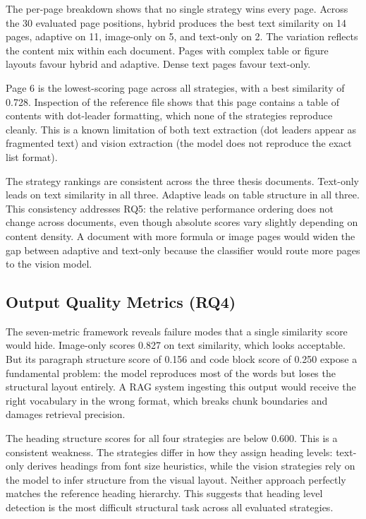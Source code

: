 \documentclass[12pt]{article}
\begin{document}
The per-page breakdown shows that no single strategy wins every page.
Across the 30 evaluated page positions, hybrid produces the best text
similarity on 14 pages, adaptive on 11, image-only on 5, and text-only
on 2. The variation reflects the content mix within each document.
Pages with complex table or figure layouts favour hybrid and adaptive.
Dense text pages favour text-only.

Page 6 is the lowest-scoring page across all strategies, with a best
similarity of 0.728. Inspection of the reference file shows that this
page contains a table of contents with dot-leader formatting, which none
of the strategies reproduce cleanly. This is a known limitation of both
text extraction (dot leaders appear as fragmented text) and vision
extraction (the model does not reproduce the exact list format).

The strategy rankings are consistent across the three thesis documents.
Text-only leads on text similarity in all three. Adaptive leads on table
structure in all three. This consistency addresses RQ5: the relative
performance ordering does not change across documents, even though absolute
scores vary slightly depending on content density. A document with more
formula or image pages would widen the gap between adaptive and text-only
because the classifier would route more pages to the vision model.

\subsection{Output Quality Metrics (RQ4)}

The seven-metric framework reveals failure modes that a single similarity
score would hide. Image-only scores 0.827 on text similarity, which looks
acceptable. But its paragraph structure score of 0.156 and code block score
of 0.250 expose a fundamental problem: the model reproduces most of the
words but loses the structural layout entirely. A RAG system ingesting this
output would receive the right vocabulary in the wrong format, which breaks
chunk boundaries and damages retrieval precision.

The heading structure scores for all four strategies are below 0.600. This
is a consistent weakness. The strategies differ in how they assign heading
levels: text-only derives headings from font size heuristics, while the
vision strategies rely on the model to infer structure from the visual
layout. Neither approach perfectly matches the reference heading hierarchy.
This suggests that heading level detection is the most difficult structural
task across all evaluated strategies.
\end{document}
